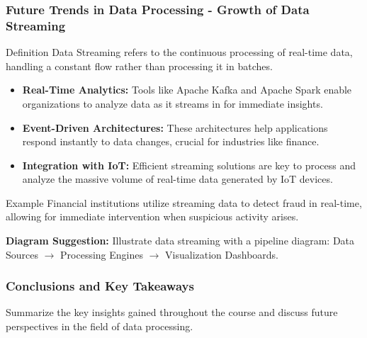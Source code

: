 \documentclass[aspectratio=169]{beamer}
\begin{document}
\begin{frame}[fragile]
    \frametitle{Future Trends in Data Processing - Growth of Data Streaming}
    \begin{block}{Definition}
        Data Streaming refers to the continuous processing of real-time data, handling a constant flow rather than processing it in batches.
    \end{block}

    \begin{itemize}
        \item \textbf{Real-Time Analytics:} Tools like Apache Kafka and Apache Spark enable organizations to analyze data as it streams in for immediate insights.
        \item \textbf{Event-Driven Architectures:} These architectures help applications respond instantly to data changes, crucial for industries like finance.
        \item \textbf{Integration with IoT:} Efficient streaming solutions are key to process and analyze the massive volume of real-time data generated by IoT devices.
    \end{itemize}
    
    \begin{block}{Example}
        Financial institutions utilize streaming data to detect fraud in real-time, allowing for immediate intervention when suspicious activity arises.
    \end{block}

    \textbf{Diagram Suggestion:} Illustrate data streaming with a pipeline diagram: Data Sources $\to$ Processing Engines $\to$ Visualization Dashboards.
\end{frame}

\begin{frame}[fragile]
    \frametitle{Conclusions and Key Takeaways}
    Summarize the key insights gained throughout the course and discuss future perspectives in the field of data processing.
\end{frame}
\end{document}
